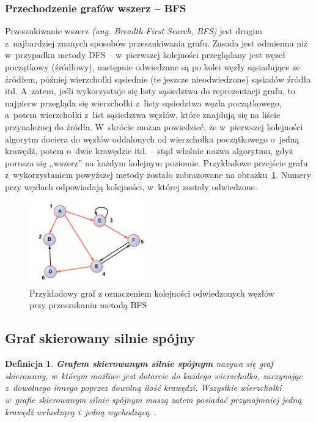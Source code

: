 \documentclass[twoside,12pt]{report}
\newtheorem{definition}{Definicja} %
\begin{document}
\subsubsection{Przechodzenie grafów wszerz – BFS}
Przeszukiwanie wszerz \textit{(ang. Breadth-First Search, BFS)} jest drugim z~najbardziej znanych sposobów przeszukiwania grafu. Zasada jest odmienna niż w~przypadku metody DFS – w~pierwszej kolejności przeglądany jest węzeł początkowy (źródłowy), następnie odwiedzane są po kolei węzły sąsiadujące ze źródłem, później wierzchołki sąsiednie (te jeszcze nieodwiedzone) sąsiadów źródła itd. A~zatem, jeśli wykorzystuje się listy sąsiedztwa do reprezentacji grafu, to najpierw przegląda się wierzchołki z~listy sąsiedztwa węzła początkowego, a~potem wierzchołki z~list sąsiedztwa węzłów, które znajdują się na liście przynależnej do źródła. W~skrócie można powiedzieć, że w~pierwszej kolejności algorytm dociera do węzłów oddalonych od wierzchołka początkowego o~jedną krawędź, potem o~dwie krawędzie itd. – stąd właśnie nazwa algorytmu, gdyż porusza się ,,wszerz'' na każdym kolejnym poziomie. Przykładowe przejście grafu z~wykorzystaniem powyższej metody zostało zobrazowane na obrazku~\ref{fig:bfs}. Numery przy węzłach odpowiadają kolejności, w~której zostały odwiedzone.

\begin{figure}[htbp]
	\centering
	\includegraphics[width=0.45\textwidth]{img/bfs}
	\caption{Przykładowy graf z oznaczeniem kolejności odwiedzonych węzłów przy przeszukaniu metodą BFS}
	\label{fig:bfs}
\end{figure}

\subsection{Graf skierowany silnie spójny}\label{sec:graf_spojny}

\begin{definition}
\textbf{Grafem skierowanym silnie spójnym} nazywa się graf skierowany, w~którym możliwe jest dotarcie do każdego wierzchołka, zaczynając z~dowolnego innego poprzez dowolną ilość krawędzi. Wszystkie wierzchołki w~grafie skierowanym silnie spójnym muszą zatem posiadać przynajmniej jedną krawędź wchodzącą i~jedną wychodzącą~\cite{silniespojny}.
\end{definition}
\end{document}
